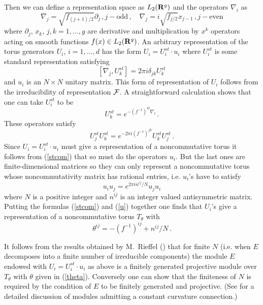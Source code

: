\documentclass[a4paper,a4paper]{article}
\begin{document}
Then we can define a representation space as $L_{2}({\bf R}^{g})$ 
and the operators $\nabla_{i}$  as 
\begin{equation} \label{nabla} 
\nabla_{j} = \sqrt{f_{(j+ 1)/2}}\partial_{j} \, , j - \mbox{odd} \, , \quad \nabla_{j} = i\sqrt{f_{j/2}}x_{j-1}\, , j - \mbox{even} 
\end{equation} 
where $\partial_{j}$, $x_{k}$, $j,k=1,\dots , g$  are derivative and multiplication by $x^{k}$ operators acting 
on smooth functions $f(x)\in L_{2}({\bf R}^{g})$.
An arbitrary representation of the torus generators $U_{i}$, $i=1, \dots, d$ has the form 
$
U_{i} = U_{i}^{st}\cdot u_{i} 
$  
where $U_{i}^{st}$ is some standard representation satisfying 
$$
[\nabla_{j}, U_{k}^{st}]= 2\pi i \delta_{jk} U_{k}^{st}
$$ 
and $u_{i}$ is an $N\times N$  unitary matrix. This form of representation of $U_{i}$ follows from the irreducibility 
of representation $\cal F$. 
A straightforward calculation shows that one can take $U_{i}^{st}$ to be   
\begin{equation}\label{Ust}
U_{k}^{st} = e^{-(f^{-1})^{kl}\nabla_{l}} \, .
\end{equation}
These operators satisfy
\begin{equation} \label{stcom}
U_{j}^{st}U_{k}^{st} = e^{-2\pi i (f^{-1})^{jk}} U_{k}^{st}U_{j}^{st} \, .
\end{equation}
Since $U_{i}= U_{i}^{st}\cdot u_{i}$ must give a representation of a noncommutative torus it follows from (\ref{stcom}) that 
so must do  the operators $u_{i}$. But the last ones are finite-dimensional matrices so they can only represent a 
noncommutative torus whose noncommutativity matrix has rational entries, i.e. $u_{i}$'s have to satisfy  
\begin{equation} \label{u}
u_{i}u_{j} = e^{2\pi i n^{ij}/N} u_{j}u_{i}
\end{equation}
where $N$ is a positive  integer and $n^{ij}$ is an integer valued antisymmetric matrix. 
Putting the formulas (\ref{stcom}) and (\ref{u}) together one finds that $U_{i}$'s give a representation of a noncommutative torus 
$T_{\theta}$ with 
\begin{equation} \label{theta}
\theta^{ij} = -(f^{-1})^{ij} + n^{ij}/N \, . 
\end{equation}


 It follows from the results obtained by M.~Rieffel (\cite{RieffelProj}) that 
for finite $N$ (i.e. when $E$ decomposes into a finite number of irreducible components) 
 the module $E$ endowed with $U_{i}=U^{st}_{i}\cdot u_{i}$ as above is a finitely generated projective module over $T_{\theta}$ with 
$\theta$ given in (\ref{theta}).  Conversely one can show that the finiteness of $N$ is required by the condition of 
$E$ to be finitely generated and projective. (See \cite{AstSchw} for a detailed discussion of modules admitting a 
constant curvature connection.)
\end{document}
